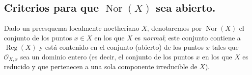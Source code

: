 \subsection{Criterios para que $\operatorname{Nor}(X)$ sea abierto.}
\label{IV.2.s6.13-fr}

\begin{env}[6.13.1]
\label{IV.2.s6.13.1-fr}
Dado un preesquema localmente noetheriano $X$, denotaremos por
$\operatorname{Nor}(X)$ el conjunto de los puntos $x\in X$ en los que $X$
es \emph{normal}; este conjunto contiene a $\operatorname{Reg}(X)$ y está contenido
en el conjunto (abierto) de los puntos $x$ tales que $\mathcal O_{X,x}$ sea
un dominio entero (es decir, el conjunto de los puntos $x$ en los que $X$
es reducido y que pertenecen a una sola componente irreducible de $X$).
\end{env}
